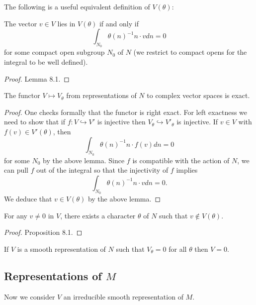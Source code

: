 The following is a useful equivalent definition of $V(\theta)$:

\begin{lemma}\label{criteria N}
    The vector $v \in V$ lies in $V(\theta)$ if and only if 
    $$\int_{N_0} \theta(n)^{-1}  n \cdot v dn = 0$$
    for some compact open subgroup $N_0$ of $N$ (we restrict to compact opens for the integral to be well defined).
\end{lemma}
\begin{proof}
    \cite{BH1} Lemma 8.1.
\end{proof}

\begin{cor}\label{exact}
    The functor $V \mapsto V_\theta$ from representations of $N$ to complex vector spaces is exact.
\end{cor}
\begin{proof}
    One checks formally that the functor is right exact. For left exactness we need to show that if $f: V \hookrightarrow V'$ is injective then $V_\theta \hookrightarrow V'_\theta$ is injective. If $v \in V$ with $f(v) \in V'(\theta)$, then 
    $$\int_{N_0} \theta(n)^{-1}n \cdot f(v) dn = 0$$
    for some $N_0$ by the above lemma. Since $f$ is compatible with the action of $N$, we can pull $f$ out of the integral so that the injectivity of $f$ implies
    $$\int_{N_0} \theta(n)^{-1}n \cdot v dn = 0.$$
    We deduce that $v \in V(\theta)$ by the above lemma.
\end{proof}

\begin{prop}
    For any $v \neq 0$ in $V$, there exists a character $\theta$ of $N$ such that $v \not\in V(\theta)$.
\end{prop}
\begin{proof}
    \cite{BH1} Proposition 8.1.
\end{proof}

\begin{cor}\label{character}
    If $V$ is a smooth representation of $N$ such that $V_\theta=0$ for all $\theta$ then $V=0$.
\end{cor}


\subsection{Representations of $M$}

Now we consider $V$ an irreducible smooth representation of $M$. 

